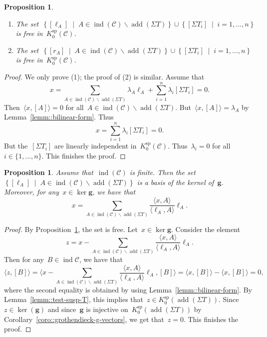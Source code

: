 \documentclass{amsart}
\newtheorem{proposition}[theorem]{Proposition}
\theoremstyle{definition}
\renewcommand{\b}[1]{{\boldsymbol{#1}}} %
\newcommand{\set}[2]{\left\{ #1 \;\middle|\; #2 \right\}} %
\newcommand{\ssm}{\smallsetminus} %
\newcommand{\cat}{\mathcal{C}}
\newcommand{\susp}{\Sigma}
\newcommand{\add}{\operatorname{add}}
\newcommand{\spl}{\operatorname{sp}}
\newcommand{\Ksp}{K_0^{\spl}}
\newcommand{\ind}{\operatorname{ind}}
\begin{document}
\begin{proposition}\label{prop::free-set}
 \begin{enumerate}
  \item The set~$\set{[\ell_A]}{A\in \ind(\cat) \ssm \add(\susp T)} \cup \set{[\susp T_i]}{i=1, \dots, n}$ is free in~$\Ksp(\cat)$.
  \item The set~$\set{[r_A]}{A\in \ind(\cat) \ssm \add(\susp T)} \cup \set{[\susp T_i]}{i=1, \dots, n}$ is free in~$\Ksp(\cat)$.
 \end{enumerate}
\end{proposition}
\begin{proof}
 We only prove (1); the proof of (2) is similar.  Assume that~
 \[
  x= \sum_{A\in \ind(\cat) \ssm \add(\susp T)} \lambda_A \ell_A + \sum_{i=1}^n \lambda_i [\susp T_i] = 0.
 \]
 Then~$\langle x, [A] \rangle = 0$ for all~$A\in\ind(\cat) \ssm \add(\susp T)$.  But~$\langle x, [A] \rangle = \lambda_A$ by Lemma~\ref{lemm::bilinear-form}.  Thus~
 \[
  x = \sum_{i=1}^n \lambda_i [\susp T_i] = 0.
 \]
 But the~$[\susp T_i]$ are linearly independent in~$\Ksp(\cat)$.  Thus~$\lambda_i = 0$ for all~$i\in \{1, \ldots, n\}$.  This finishes the proof.
\end{proof}

\begin{proposition}
 Assume that~$\ind(\cat)$ is finite.  Then the set~$\set{[\ell_A]}{A\in \ind(\cat) \ssm \add(\susp T)}$ is a basis of the kernel of~$\b g$.  Moreover, for any~$x\in \ker \b g$, we have that
 \[
  x= \sum_{A\in \ind(\cat) \ssm \add(\susp T)} \frac{\langle x, A \rangle}{\langle \ell_A, A \rangle} \ell_A.
 \]
\end{proposition}
\begin{proof}
By Proposition~\ref{prop::free-set}, the set is free.  Let~$x\in \ker \b g$.  Consider the element
\[
 z = x- \sum_{A\in \ind(\cat) \ssm \add(\susp T)} \frac{\langle x, A \rangle}{\langle \ell_A, A \rangle} \ell_A.
\]
Then for any~$B\in \ind{\cat}$, we have that
\[
 \langle  z, [B] \rangle = \Big\langle x- \sum_{A\in \ind(\cat) \ssm \add(\susp T)} \frac{\langle x, A \rangle}{\langle \ell_A, A \rangle} \ell_A, [B] \Big\rangle = \langle x, [B] \rangle - \langle x, [B] \rangle = 0, 
\]
where the second equality is obtained by using Lemma~\ref{lemm::bilinear-form}.  By Lemma~\ref{lemm::test-susp-T}, this implies that~$z\in \Ksp(\add(\susp T))$.  Since~$z\in \ker(\b g)$ and since~$\b g$ is injective on~$\Ksp(\add (\susp T))$ by Corollary~\ref{coro::grothendieck-g-vectors}, we get that~$z=0$.  This finishes the proof.
\end{proof}
\end{document}
